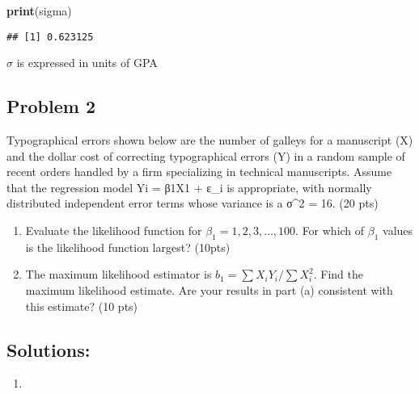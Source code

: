 \documentclass[
]{article}
\newenvironment{Shaded}{\begin{snugshade}}{\end{snugshade}}
\newcommand{\KeywordTok}[1]{\textcolor[rgb]{0.13,0.29,0.53}{\textbf{#1}}}
\newcommand{\NormalTok}[1]{#1}
\begin{document}
\begin{Shaded}
\begin{Highlighting}[]
\KeywordTok{print}\NormalTok{(sigma)}
\end{Highlighting}
\end{Shaded}

\begin{verbatim}
## [1] 0.623125
\end{verbatim}

\(\sigma\) is expressed in units of GPA

\hypertarget{problem-2}{%
\subsection{Problem 2}\label{problem-2}}

Typographical errors shown below are the number of galleys for a
manuscript (X) and the dollar cost of correcting typographical errors
(Y) in a random sample of recent orders handled by a firm specializing
in technical manuscripts. Assume that the regression model Yi = β1X1 +
ε\_i is appropriate, with normally distributed independent error terms
whose variance is a σ\^{}2 = 16. (20 pts)

\begin{enumerate}
\def\labelenumi{\alph{enumi})}
\item
  Evaluate the likelihood function for \(\beta_{1}= 1,2, 3,…,100\). For
  which of \(\beta_{1}\) values is the likelihood function largest?
  (10pts)\\
\item
  The maximum likelihood estimator is
  \(b_{1}=\sum X_{i} Y_{i}/\sum X_{i}^2\). Find the maximum likelihood
  estimate. Are your results in part (a) consistent with this estimate?
  (10 pts)\\
\end{enumerate}

\hypertarget{solutions-1}{%
\subsection{Solutions:}\label{solutions-1}}

\begin{enumerate}
\def\labelenumi{\alph{enumi})}
\item
\end{enumerate}
\end{document}
